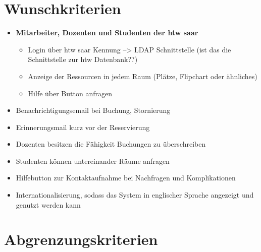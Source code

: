 \documentclass[a4paper,report,headsepline]{scrreprt}
\begin{document}
\section{Wunschkriterien}\label{wunschkriterien}

\begin{itemize}
\item \textbf{Mitarbeiter, Dozenten und Studenten der htw saar}
\begin{itemize}
\item Login über htw saar Kennung --> LDAP Schnittstelle (ist das die Schnittstelle zur htw Datenbank??)
\item Anzeige der Ressourcen in jedem Raum (Plätze, Flipchart oder ähnliches)
\item Hilfe über Button anfragen

\end{itemize}

\item Benachrichtigungsemail bei Buchung, Stornierung
\item Erinnerungsmail kurz vor der Reservierung
\item Dozenten besitzen die Fähigkeit Buchungen zu überschreiben
\item Studenten können untereinander Räume anfragen
\item Hilfebutton zur Kontaktaufnahme bei Nachfragen und Komplikationen
\item Internationalisierung, sodass das System in englischer Sprache angezeigt und genutzt werden kann

\end{itemize}

\section{Abgrenzungskriterien}\label{abgrenzungskriterien}
\end{document}
